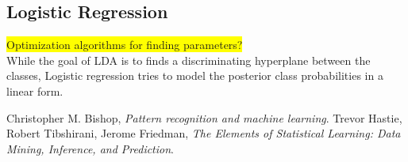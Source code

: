\documentclass[10pt,a4paper]{article}
\begin{document}
\subsection{Logistic Regression}
\label{sub:Logistic Regression}
\colorbox{yellow}{Optimization algorithms for finding parameters?}\\
While the goal of LDA is to finds a discriminating hyperplane between the classes, Logistic regression tries to model the posterior class probabilities in a linear form. 
%
\clearpage
\begin{thebibliography}{99} %
  Christopher M. Bishop,
  \emph{Pattern recognition and machine learning}.
  Trevor Hastie, Robert Tibshirani, Jerome Friedman,
  \emph{The Elements of Statistical Learning: Data Mining, Inference, and Prediction}.
\end{thebibliography}
%
\end{document}
